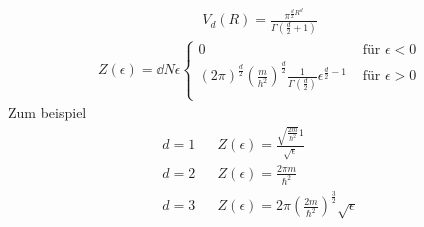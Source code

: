 \begin{enumerate}[I)]
    \begin{align*}
      V_d(R) = \frac{\pi^{\frac{d}{2} R^d}}{\Gamma\left( \frac{d}{2} + 1 \right)}
    \end{align*}
    \begin{align*}
      Z(\epsilon) = \dd{N}{\epsilon} \begin{cases}
        0 & \text{ für } \epsilon < 0 \\
        (2\pi)^{\frac{d}{2}} \left( \frac{m}{h^2} \right)^{\frac{d}{2}}
        \frac{1}{\Gamma(\frac{d}{2})} \epsilon^{\frac{d}{2} - 1} & \text{ für } \epsilon > 0 \\
      \end{cases} 
    \end{align*}
    Zum beispiel
    \begin{align*}
      d = 1 && Z(\epsilon) = \frac{\sqrt{\frac{2 m }{ \hbar^2}} 1}{\sqrt{\epsilon}} \\
      d = 2 && Z(\epsilon) = \frac{2 \pi m }{ \hbar^2} \\
      d = 3 && Z(\epsilon) = 2 \pi \left( \frac{2m }{ \hbar^2} \right)^{\frac{3}{2}} \sqrt{\epsilon}
    \end{align*}
\end{enumerate} 
